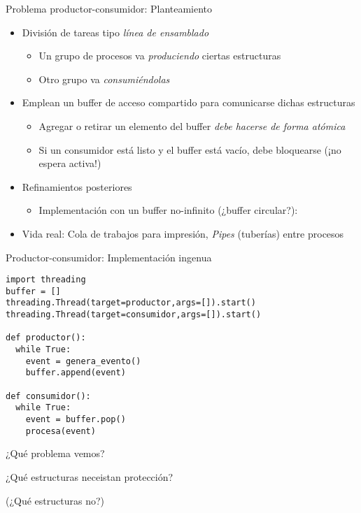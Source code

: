 \documentclass[presentation]{beamer}
\begin{document}
\begin{frame}[label={sec:org2ccd3f0}]{Problema productor-consumidor: Planteamiento}
\begin{itemize}
\item División de tareas tipo \emph{línea de ensamblado}
\begin{itemize}
\item Un grupo de procesos va \emph{produciendo} ciertas estructuras
\item Otro grupo va \emph{consumiéndolas}
\end{itemize}
\item Emplean un buffer de acceso compartido para comunicarse dichas
estructuras
\begin{itemize}
\item Agregar o retirar un elemento del buffer \emph{debe hacerse de forma
atómica}
\item Si un consumidor está listo y el buffer está vacío, debe
bloquearse (¡no espera activa!)
\end{itemize}
\item Refinamientos posteriores
\begin{itemize}
\item Implementación con un buffer no-infinito (¿buffer circular?):
\end{itemize}
\item Vida real: Cola de trabajos para impresión, \emph{Pipes} (tuberías) entre
procesos
\end{itemize}
\end{frame}
\begin{frame}[label={sec:org8ff4667},fragile]{Productor-consumidor: Implementación ingenua}
 \begin{verbatim}
import threading
buffer = []
threading.Thread(target=productor,args=[]).start()
threading.Thread(target=consumidor,args=[]).start()

def productor():
  while True:
    event = genera_evento()
    buffer.append(event)

def consumidor():
  while True:
    event = buffer.pop()
    procesa(event)
\end{verbatim}
\begin{center}
¿Qué problema vemos?

¿Qué estructuras neceistan protección?

(¿Qué estructuras no?)
\end{center}
\end{frame}
\end{document}
